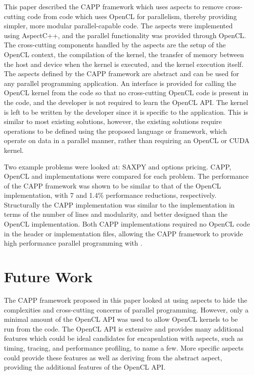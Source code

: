 \documentclass{sig-alternate-05-2015}
\begin{document}
This paper described the  CAPP framework which uses aspects to remove
cross-cutting code from \CPP code which uses OpenCL for parallelism, thereby providing simpler, more modular
parallel-capable \CPP code. The aspects were implemented using AspectC++,
and the parallel functionality was provided through OpenCL. The cross-cutting 
components handled by the aspects are the setup of the OpenCL
context, the compilation of the kernel, the transfer of memory between the 
host and device when the kernel is executed, and the kernel execution itself. 
The aspects defined by the  CAPP framework are abstract and can be used for 
any parallel programming application. An interface is provided for calling the 
OpenCL kernel from the \CPP code so that no cross-cutting OpenCL code is present in
the \CPP code, and the developer is not required to learn the OpenCL API. The
kernel is left to be written by the developer since it is specific to the
application. This is similar to most existing solutions, however, the existing
solutions require operations to be defined using the proposed language or
framework, which operate on data in a parallel manner, rather than requiring an
OpenCL or CUDA kernel.

Two example problems were looked at: SAXPY and options pricing. CAPP, OpenCL 
and \CPP implementations were compared for each problem. The performance of the 
 CAPP framework was shown to be similar to that of the OpenCL
implementation, with 7 and 1.4\% performance reductions, respectively. Structurally 
the CAPP implementation was similar 
to the \CPP  implementation in terms of the number of lines and modularity, and
better designed than the OpenCL implementation. Both CAPP implementations
required no OpenCL code in the \CPP header or implementation files, allowing the
 CAPP framework to provide high performance parallel programming with \CPP.

\section{Future Work}\label{sec:future}

The  CAPP framework proposed in this paper looked at using aspects to hide
the complexities and cross-cutting concerns of parallel programming. However, only a
minimal amount of the OpenCL API was used to allow OpenCL kernels to be run from the
\CPP code. The OpenCL API is extensive and provides many additional features which 
could be ideal candidates for encapsulation with aspects, such as timing,
tracing, and performance profiling, to name a few. More specific aspects could
provide these features as well as deriving from the abstract aspect, providing
the additional features of the OpenCL API.
\end{document}
